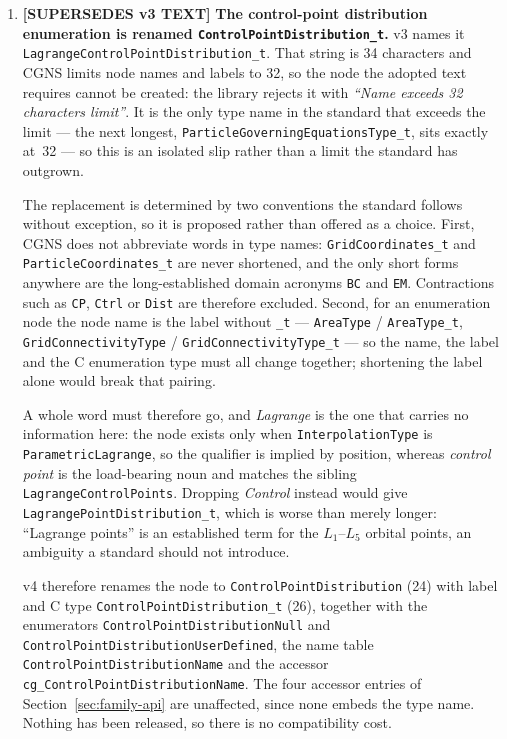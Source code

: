 \documentclass[11pt,letterpaper]{article}
\newif\ifvfourdraft
\newenvironment{v4block}{\ifvfourdraft\color{v4violet}\fi\ignorespaces}{\par}
\newcommand{\SUPERSEDESIV}{\ifvfourdraft
  \textcolor{v4violet}{\textbf{[SUPERSEDES v3 TEXT]}}\else
  \textcolor{clarifybrown}{\textbf{[SUPERSEDES v3 TEXT]}}\fi}
\begin{document}
{\begin{v4block}
\begin{enumerate}[leftmargin=1.4em,itemsep=0.5em]
  \item \SUPERSEDESIV{} \textbf{The control-point distribution enumeration is
    renamed \texttt{ControlPointDistribution\_t}.}  v3 names it
    \texttt{LagrangeControlPointDistribution\_t}.  That string is 34 characters
    and CGNS limits node names and labels to 32, so the node the adopted text
    requires cannot be created: the library rejects it with \emph{``Name exceeds
    32 characters limit''}.  It is the only type name in the standard that
    exceeds the limit --- the next longest,
    \texttt{ParticleGoverningEquationsType\_t}, sits exactly at~32 --- so this is
    an isolated slip rather than a limit the standard has outgrown.

    The replacement is determined by two conventions the standard follows without
    exception, so it is proposed rather than offered as a choice.  First, CGNS
    does not abbreviate words in type names: \texttt{GridCoordinates\_t} and
    \texttt{ParticleCoordinates\_t} are never shortened, and the only short forms
    anywhere are the long-established domain acronyms \texttt{BC} and
    \texttt{EM}.  Contractions such as \texttt{CP}, \texttt{Ctrl} or
    \texttt{Dist} are therefore excluded.  Second, for an enumeration node the
    node name is the label without \texttt{\_t} --- \texttt{AreaType} /
    \texttt{AreaType\_t}, \texttt{GridConnectivityType} /
    \texttt{GridConnectivityType\_t} --- so the name, the label and the C
    enumeration type must all change together; shortening the label alone would
    break that pairing.

    A whole word must therefore go, and \emph{Lagrange} is the one that carries
    no information here: the node exists only when \texttt{InterpolationType} is
    \texttt{ParametricLagrange}, so the qualifier is implied by position, whereas
    \emph{control point} is the load-bearing noun and matches the sibling
    \texttt{LagrangeControlPoints}.  Dropping \emph{Control} instead would give
    \texttt{LagrangePointDistribution\_t}, which is worse than merely longer:
    ``Lagrange points'' is an established term for the $L_1$--$L_5$ orbital
    points, an ambiguity a standard should not introduce.

    v4 therefore renames the node to \texttt{ControlPointDistribution} (24) with
    label and C type \texttt{ControlPointDistribution\_t} (26), together with the
    enumerators \texttt{ControlPointDistributionNull} and
    \texttt{ControlPointDistributionUserDefined}, the name table
    \texttt{ControlPointDistributionName} and the accessor
    \texttt{cg\_ControlPointDistributionName}.  The four accessor entries of
    Section~\ref{sec:family-api} are unaffected, since none embeds the type name.
    Nothing has been released, so there is no compatibility cost.


\end{enumerate}
\end{v4block}}
\end{document}
